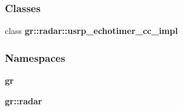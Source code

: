 \subsubsection*{Classes}
\begin{DoxyCompactItemize}
\item 
class {\bf gr\+::radar\+::usrp\+\_\+echotimer\+\_\+cc\+\_\+impl}
\end{DoxyCompactItemize}
\subsubsection*{Namespaces}
\begin{DoxyCompactItemize}
\item 
 {\bf gr}
\item 
 {\bf gr\+::radar}
\end{DoxyCompactItemize}
